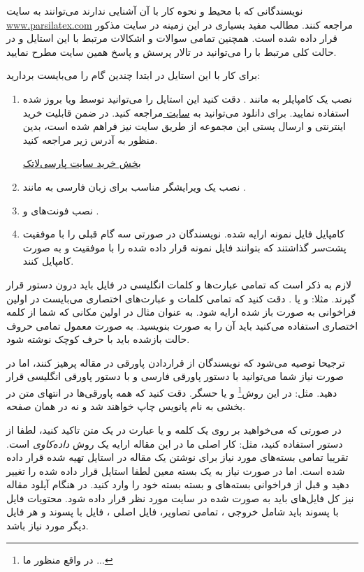 \documentclass{CSICC}
\begin{document}
نویسندگانی که با محیط \lr{\LaTeX} و نحوه کار با آن آشنایی ندارند می‌توانند به سایت
\url{www.parsilatex.com}
مراجعه کنند. مطالب مفید بسیاری در این زمینه در سایت مذکور قرار داده شده است. همچنین تمامی سوالات و اشکالات مرتبط با این استایل  و در حالت کلی مرتبط با \lr{\LaTeX} را می‌توانید در تالار پرسش و پاسخ همین سایت مطرح نمایید.  

برای کار با این استایل در ابتدا چندین گام را می‌بایست بردارید:
\begin{enumerate} 
\item
نصب یک کامپایلر به مانند . دقت کنید این استایل را می‌توانید توسط
 ویا 
بروز شده استفاده نمایید. برای  دانلود  می‌توانید به
\href{www.tug.org/texlive/}{سایت }
مراجعه کنید. در ضمن قابلیت خرید اینترنتی و ارسال پستی این مجموعه از طریق سایت  نیز فراهم شده است، بدین منظور به آدرس زیر مراجعه کنید.

\href{http://parsilatex.com/site/product/%D9%85%D8%AC%D9%85%D9%88%D8%B9%D9%87-%D9%BE%D8%A7%D8%B1%D8%B3%DB%8C%E2%80%8C%D9%84%D8%A7%D8%AA%DA%A9/}{
بخش خرید سایت پارسی‌لاتک}


\item
نصب یک ویرایشگر مناسب برای زبان فارسی به مانند .
\item
نصب فونت‌های  و .
\item
کامپایل فایل نمونه ارایه شده. نویسندگان در صورتی سه گام قبلی را با موفقیت پشت‌سر گذاشتند که بتوانند فایل نمونه قرار داده شده را با موفقیت و به صورت  کامپایل کنند. 
\end{enumerate}
لازم به ذکر است که تمامی عبارت‌ها و کلمات انگلیسی در فایل \lr{\LaTeX} باید درون دستور  قرار گیرند. مثلا:
 و یا .
دقت کنید که تمامی کلمات و عبارت‌های اختصاری می‌بایست در اولین فراخوانی به صورت باز شده ارایه شود. به عنوان مثال در اولین مکانی که شما از کلمه اختصاری   استفاده می‌کنید باید آن را به صورت 
بنویسید. به صورت معمول تمامی حروف حالت بازشده باید با حرف کوچک نوشته شود.

ترجیحا توصیه می‌شود که نویسندگان از قراردادن پاورقی در مقاله پرهیز کنند، اما در صورت نیاز شما می‌توانید با دستور  پاورقی فارسی و با دستور  پاورقی انگلیسی قرار دهید. مثل: در این روش\footnote{در واقع منظور ما ...} و یا حسگر. دقت کنید که همه پاورقی‌ها در انتهای متن در بخشی به نام پانویس چاپ خواهند شد و نه در همان صفحه.

در صورتی که می‌خواهید بر روی یک کلمه و یا عبارت در یک متن تاکید کنید، لطفا از دستور  استفاده کنید، مثل: کار اصلی ما در این مقاله ارایه یک روش
\emph{داده‌کاوی}
است. تقریبا تمامی بسته‌های مورد نیاز برای نوشتن یک مقاله در استایل \lr{\LaTeX} تهیه شده قرار داده شده است. اما در صورت نیاز به یک بسته معین لطفا استایل قرار داده شده را تغییر دهید و قبل از فراخوانی بسته‌های  و بسته \lr{\XePersian} بسته خود را وارد کنید. در هنگام آپلود مقاله نیز کل فایل‌های \lr{\LaTeX} باید به صورت  شده در سایت مورد نظر قرار داده شود. محتویات فایل با پسوند  باید شامل خروجی ، تمامی تصاویر، فایل اصلی ، فایل با پسوند  و هر فایل دیگر مورد نیاز باشد.
\end{document}
